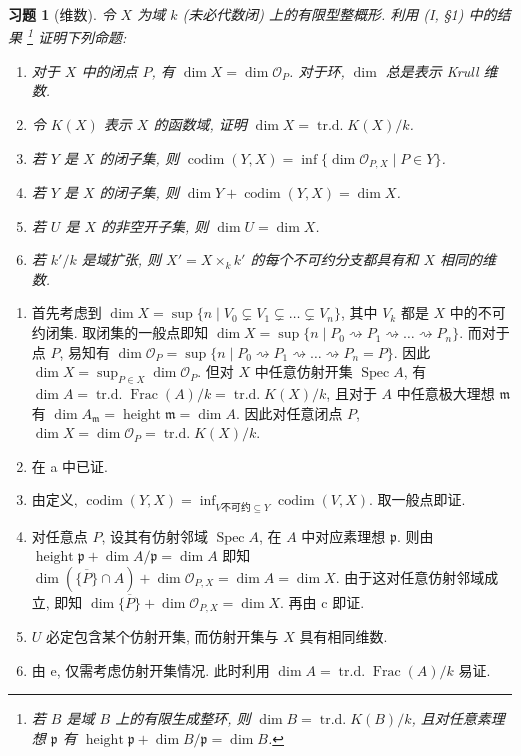 \documentclass{article}
\makeatletter
\theoremstyle{exercise}
\newtheorem{exercise}{习题}[section]
\newenvironment{proofc}{\proof}{\endproof}
\def\printfootnotes{}
\def\gp{\mathfrak{p}}
\def\gm{\mathfrak{m}}
\def\cO{\mathcal{O}}
\def\spto{\rightsquigarrow}
\def\Spec{\operatorname{Spec}}
\def\dim{\operatorname{dim}}
\def\codim{\operatorname{codim}}
\def\height{\operatorname{height}}
\def\Frac{\operatorname{Frac}}
\def\trd{\operatorname{tr.d.}}
\def\clearfootnotes{\def\@printfootnotes{}}
\makeatother
\begin{document}
\begin{exercise}[维数]
  令 $X$ 为域 $k$ (未必代数闭) 上的有限型整概形. 利用 (I, §1) 中的结果%
  \footnote{若 $B$ 是域 $B$ 上的有限生成整环, 则 $\dim B = \trd K(B) / k$,
    且对任意素理想 $\gp$ 有 $\height \gp + \dim B / \gp = \dim B$.}%
  证明下列命题:
  \begin{enumerate}[label={(\alph*)}]
    \item 对于 $X$ 中的闭点 $P$, 有 $\dim X = \dim \cO_P$. 对于环, $\dim$ 总是表示 Krull 维数.
    \item 令 $K(X)$ 表示 $X$ 的函数域, 证明 $\dim X = \trd K(X) / k$.
    \item 若 $Y$ 是 $X$ 的闭子集, 则 $\codim(Y, X) = \inf \{ \dim \cO_{P, X} \mid P \in Y \}$.
    \item 若 $Y$ 是 $X$ 的闭子集, 则 $\dim Y + \codim(Y, X) = \dim X$.
    \item 若 $U$ 是 $X$ 的非空开子集, 则 $\dim U = \dim X$.
    \item 若 $k' / k$ 是域扩张, 则 $X' = X \times_k k'$ 的每个不可约分支都具有和 $X$ 相同的维数.
  \end{enumerate}
\end{exercise}
\printfootnotes
\clearfootnotes

\begin{proofc}
  \begin{enumerate}[label={(\alph*)}]
    \item 首先考虑到 $\dim X = \sup \{ n \mid V_0 \subsetneq V_1 \subsetneq \dots \subsetneq V_n \}$,
          其中 $V_k$ 都是 $X$ 中的不可约闭集.
          取闭集的一般点即知 $\dim X = \sup \{ n \mid P_0 \spto P_1 \spto \dots \spto P_n \}$.
          而对于点 $P$, 易知有 $\dim \cO_P = \sup \{ n \mid P_0 \spto P_1 \spto \dots \spto P_n = P \}$.
          因此 $\dim X = \sup_{P \in X} \dim \cO_P$.
          但对 $X$ 中任意仿射开集 $\Spec A$, 有 $\dim A = \trd \Frac(A) / k = \trd K(X) / k$,
          且对于 $A$ 中任意极大理想 $\gm$ 有 $\dim A_{\gm} = \height \gm = \dim A$.
          因此对任意闭点 $P$, $\dim X = \dim \cO_P = \trd K(X) / k$.
    \item 在 a 中已证.
    \item 由定义, $\codim(Y, X) = \inf_{V \text{不可约} \subseteq Y} \codim(V, X)$.
          取一般点即证.
    \item 对任意点 $P$, 设其有仿射邻域 $\Spec A$, 在 $A$ 中对应素理想 $\gp$.
          则由 $\height \gp + \dim A / \gp = \dim A$ 即知
          $\dim (\overline{\{P\}} \cap A) + \dim \cO_{P, X} = \dim A = \dim X$.
          由于这对任意仿射邻域成立, 即知 $\dim \overline{\{P\}} + \dim \cO_{P, X} = \dim X$.
          再由 c 即证.
    \item $U$ 必定包含某个仿射开集, 而仿射开集与 $X$ 具有相同维数.
    \item 由 e, 仅需考虑仿射开集情况.
          此时利用 $\dim A = \trd \Frac(A) / k$ 易证.
          \qedhere
  \end{enumerate}
\end{proofc}
\end{document}
